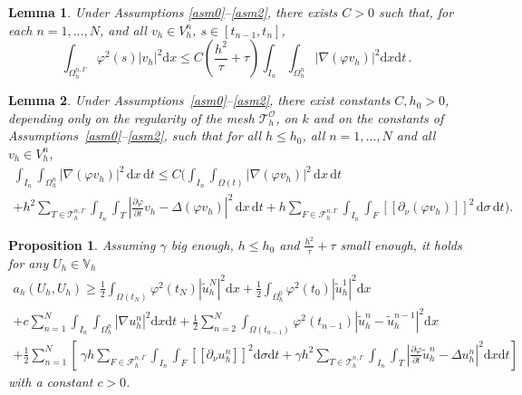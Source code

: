 \documentclass[10pt,a4paper]{amsart}
\newtheorem{lemma}{Lemma}
\newtheorem{proposition}{Proposition}
\newcommand{\dsigma}{\mathrm{d}\sigma}
\newcommand{\dt}{\mathrm{d}t}
\newcommand{\dx}{\mathrm{d}x}
\begin{document}
\begin{lemma}
  \label{LemInverseT}Under Assumptions {\ref{asm0}--\ref{asm2}}, there exists $C>0$ such that, for each $n=1,\ldots,N$, {and all $v_h \in  V_h^n$,  $s\in[t_{n-1},t_n]$,}
\begin{equation}
    {\int_{\Omega_h^{n,\Gamma}}} \varphi^2 (s) |v_h |^2 \dx
    \leqslant C {\left(\frac{h^2}{\tau}+\tau\right)}  \int_{I_n} \int_{\Omega^n_h} | \nabla (\varphi v_h) |^2 \dx \dt \,. \label{evident2}
  \end{equation}
\end{lemma}

\begin{lemma}
	\label{LemMag1}
	Under Assumptions~\ref{asm0}--\ref{asm2}, there exist constants $C,h_0>0$, depending only on the regularity of the mesh $\mathcal{T}_h^{\mathcal{O}}$, on $k$ and on the constants of Assumptions~\ref{asm0}--\ref{asm2}, such that for all $h\leqslant h_0$, all $n=1,\ldots,N$ and all $v_h \in V_h^n$,
	\begin{multline*}
		\int_{I_n} \int_{\Omega_h^n} | \nabla (\varphi v_h) |^2 \, \dx \, \dt
		\leq C \Bigg(
		\int_{I_n} \int_{\Omega(t)} | \nabla (\varphi v_h) |^2 \, \dx \, \dt \\
		+ h^2 \sum_{T\in\mathcal{T}_h^{n,\Gamma}}\int_{I_n} \int_{T}
		\left| \frac{\partial \varphi}{\partial t} v_h - \Delta (\varphi v_h) \right|^2 \, \dx \, \dt
		+ h \sum_{F\in\mathcal{F}_h^{n, \Gamma}} \int_{I_n}  \int_{F}	 [\![\partial_\nu (\varphi v_h)]\!] ^2 \, \dsigma \, \dt
		\Bigg).
	\end{multline*}
\end{lemma}

\begin{proposition}\label{coerc}
Assuming $\gamma$ big enough, $h\leqslant h_0$ and $\frac{h^2}{\tau}+\tau$ small  enough, it holds for any $U_h\in\mathbb{V}_h$
  \begin{multline*}
       a_h (U_h, U_h) \geqslant \frac{1}{2}  \int_{\Omega (t_N)} \varphi^2 (t_N) |
     \tilde{u}_h^N |^2 \dx + \frac{1}{2}  \int_{\Omega_h^0} \varphi^2 (t_0)
     | \tilde{u}_h^1 |^2 \dx \\
   + c \sum_{n = 1}^N \int_{I_n} \int_{\Omega^n_h} | \nabla u^n_h |^2 \dx \dt + \frac{1}{2} \sum_{n = 2}^N  \int_{\Omega (t_{n - 1})} \varphi^2
     (t_{n - 1})  | \tilde{u}_h^n - \tilde{u}_h^{n - 1} |^2 \dx \\
   + \frac{1}{2} \sum_{n = 1}^N \left[ \ \gamma h
   \sum_{F\in\mathcal{F}_h^{n, \Gamma}}  \int_{I_n}\int_{F}[\![\partial_\nu u^n_h]\!]^2 \dsigma \dt + \gamma h^2 \sum_{T\in\mathcal{T}_h^{n,\Gamma}} \int_{I_n} \int_{T}
     \left| \frac{\partial \varphi}{\partial t}  \tilde{u}^n_h - \Delta u^n_h
     \right|^2 \dx \dt \right]
  \end{multline*}
  with a constant $c > 0$.
\end{proposition}
\end{document}
